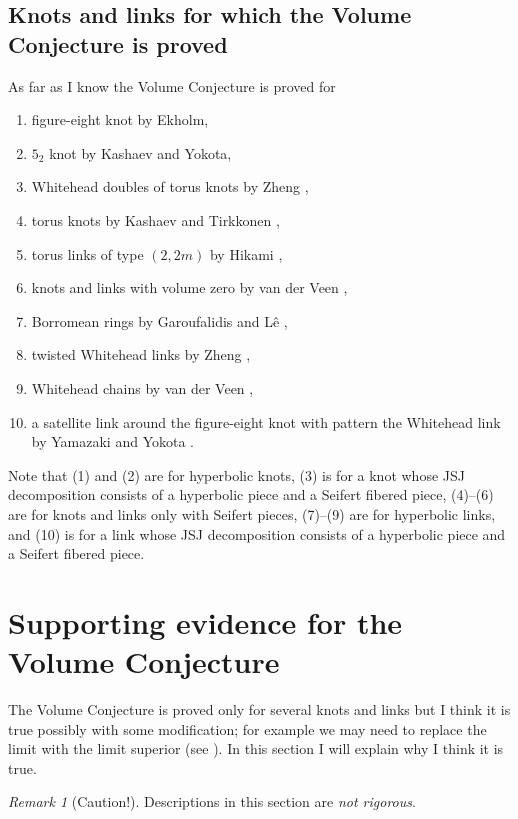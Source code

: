 \documentclass{amsart}
\theoremstyle{definition}
\theoremstyle{remark}
\newtheorem{remark}[theorem]{Remark}
\numberwithin{equation}{section}
\begin{document}
\subsection{Knots and links for which the Volume Conjecture is proved}
As far as I know the Volume Conjecture is proved for
\begin{enumerate}
\item figure-eight knot by Ekholm,
\item $5_2$ knot by Kashaev and Yokota,
\item Whitehead doubles of torus knots by Zheng \cite{Zheng:CHIAM22007},
\item torus knots by Kashaev and Tirkkonen \cite{Kashaev/Tirkkonen:ZAPNS2000},
\item torus links of type $(2,2m)$ by Hikami \cite{Hikami:COMMP2004},
\item knots and links with volume zero by van der Veen \cite{van_der_veen:2008},
\item Borromean rings by Garoufalidis and L{\^e} \cite{Garoufalidis/Le:2005},
\item twisted Whitehead links by Zheng \cite{Zheng:CHIAM22007},
\item Whitehead chains by van der Veen \cite{van_der_Veen:ACTMV2009},
\item a satellite link around the figure-eight knot with pattern the Whitehead link by Yamazaki and Yokota \cite{Yamazaki/Yokota}.
\end{enumerate}
Note that (1) and (2) are for hyperbolic knots, (3) is for a knot whose JSJ decomposition consists of a hyperbolic piece and a Seifert fibered piece, (4)--(6) are for knots and links only with Seifert pieces, (7)--(9) are for hyperbolic links, and (10) is for a link whose JSJ decomposition consists of a hyperbolic piece and a Seifert fibered piece.
\section{Supporting evidence for the Volume Conjecture}
\label{sec:VC_proof}
The Volume Conjecture is proved only for several knots and links but I think it is true possibly with some modification; for example we may need to replace the limit with the limit superior (see \cite[Conjecture~2]{van_der_Veen:ACTMV2009}).
In this section I will explain why I think it is true.
\begin{remark}[Caution!]
Descriptions in this section are {\em not rigorous}.
\end{remark}
\end{document}
